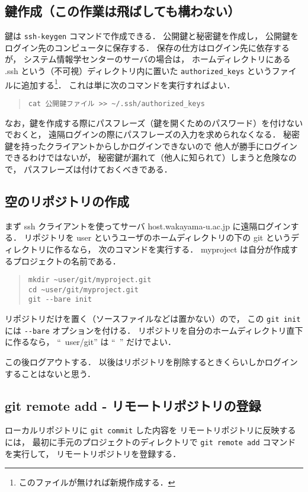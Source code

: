 \documentclass[a4j,10pt]{jarticle}
\begin{document}
\subsection{鍵作成（この作業は飛ばしても構わない）}
鍵は \verb|ssh-keygen| コマンドで作成できる．
公開鍵と秘密鍵を作成し，
公開鍵をログイン先のコンピュータに保存する．
保存の仕方はログイン先に依存するが，
システム情報学センターのサーバの場合は，
ホームディレクトリにある .ssh という（不可視）ディレクトリ内に置いた
\verb|authorized_keys|
というファイルに追加する\footnote{このファイルが無ければ新規作成する．}．
これは単に次のコマンドを実行すればよい．

\begin{quote}
\begin{verbatim}
cat 公開鍵ファイル >> ~/.ssh/authorized_keys
\end{verbatim}
\end{quote}

なお，鍵を作成する際にパスフレーズ（鍵を開くためのパスワード）を付けないでおくと，
遠隔ログインの際にパスフレーズの入力を求められなくなる．
秘密鍵を持ったクライアントからしかログインできないので
他人が勝手にログインできるわけではないが，
秘密鍵が漏れて（他人に知られて）しまうと危険なので，
パスフレーズは付けておくべきである．

\subsection{空のリポジトリの作成}
まず ssh クライアントを使ってサーバ host.wakayama-u.ac.jp に遠隔ログインする．
リポジトリを user というユーザのホームディレクトリの下の
git というディレクトリに作るなら，
次のコマンドを実行する．
myproject は自分が作成するプロジェクトの名前である．

\begin{quote}
\begin{verbatim}
mkdir ~user/git/myproject.git
cd ~user/git/myproject.git
git --bare init
\end{verbatim}
\end{quote}

リポジトリだけを置く（ソースファイルなどは置かない）ので，
この \verb|git init| には \verb|--bare| オプションを付ける．
リポジトリを自分のホームディレクトリ直下に作るなら，
``~user/git'' は ``~'' だけでよい．

この後ログアウトする．
以後はリポジトリを削除するときくらいしかログインすることはないと思う．

\subsection{git remote add - リモートリポジトリの登録}
ローカルリポジトリに \verb|git commit| した内容を
リモートリポジトリに反映するには，
最初に手元のプロジェクトのディレクトリで
\verb|git remote add| コマンドを実行して，
リモートリポジトリを登録する．
\end{document}

